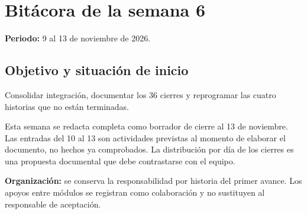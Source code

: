 \section{Bitácora de la semana 6}
\textbf{Periodo:} 9 al 13 de noviembre de 2026.

\notaBorrador

\subsection{Objetivo y situación de inicio}
Consolidar integración, documentar los 36 cierres y reprogramar las cuatro historias que no están terminadas.

Esta semana se redacta completa como borrador de cierre al 13 de noviembre. Las entradas del 10 al 13 son actividades previstas al momento de elaborar el documento, no hechos ya comprobados. La distribución por día de los cierres es una propuesta documental que debe contrastarse con el equipo.

\textbf{Organización:} se conserva la responsabilidad por historia del primer avance. Los apoyos entre módulos se registran como colaboración y no sustituyen al responsable de aceptación.

